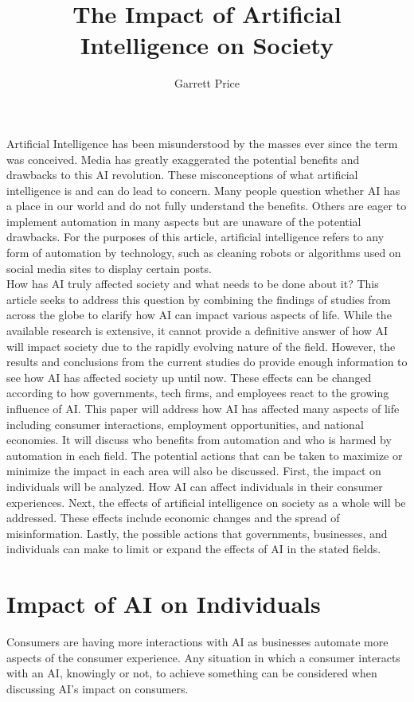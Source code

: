 \documentclass[12pt, man]{apa6}
\title{The Impact of Artificial Intelligence on Society}
\author{Garrett Price}
\affiliation{Brigham Young University}
\begin{document}
\maketitle

Artificial Intelligence has been misunderstood by the masses ever since the term was conceived.  Media has greatly exaggerated the potential
benefits and drawbacks to this AI revolution.  These misconceptions of what artificial intelligence is and can do lead to concern. Many people question
whether AI has a place in our world and do not fully understand the benefits. Others are eager to implement automation in many aspects but are unaware of the
potential drawbacks.  For the purposes of this article, artificial intelligence refers to any form of automation by technology, such as cleaning robots or algorithms used on social media sites to display certain posts.\\
How has AI truly affected society and what needs to be done about it? This article seeks to address this question by combining the findings of studies from across the globe to clarify how AI can impact various aspects of life.  While the available research is extensive, it cannot provide a definitive answer of how AI will impact society due to the rapidly evolving nature of the field.  However, the results and conclusions from the current studies do provide enough information to see how AI has affected society up until now.  These effects can be changed according to how governments, tech firms, and employees react to the growing influence of AI.  This paper will address how AI has affected many aspects of life including consumer interactions, employment opportunities, and national economies.  It will discuss who benefits from automation and who is harmed by automation in each field.  The potential actions that can be taken to maximize or minimize the impact in each area will also be discussed.  First, the impact on individuals will be analyzed.  How AI can affect individuals in their consumer experiences.  Next, the effects of artificial intelligence on society as a whole will be addressed.  These effects include economic changes and the spread of misinformation.  Lastly, the possible actions that governments, businesses, and individuals can make to limit or expand the effects of AI in the stated fields.
\newpage
\section*{Impact of AI on Individuals}
Consumers are having more interactions with AI as businesses automate more aspects of the consumer experience.  Any situation in which a consumer interacts with an AI, knowingly or not, to achieve something can be considered when discussing AI's impact on consumers.\\
\end{document}
